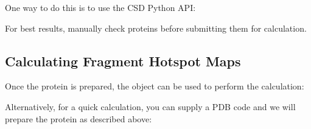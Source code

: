 \documentclass[letterpaper,10pt,english]{sphinxmanual}
\begin{document}
One way to do this is to use the CSD Python API:

\begin{sphinxVerbatim}[commandchars=\\\{\}]
   

  
   
\end{sphinxVerbatim}

For best results, manually check proteins before submitting them for calculation.


\subsection{Calculating Fragment Hotspot Maps}
\label{\detokenize{tutorial:calculating-fragment-hotspot-maps}}
Once the protein is prepared, the {\hyperref[\detokenize{calculation_api:hotspots.calculation.Runner}]{}} object can be used to perform the calculation:

\begin{sphinxVerbatim}[commandchars=\\\{\}]
   

  
  
\end{sphinxVerbatim}

Alternatively, for a quick calculation, you can supply a PDB code and we will prepare the protein as described above:

\begin{sphinxVerbatim}[commandchars=\\\{\}]
  
  
\end{sphinxVerbatim}
\end{document}
